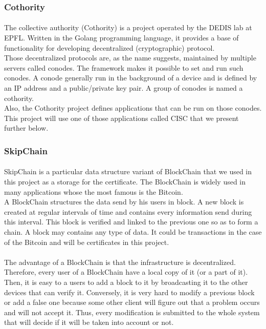 \documentclass[11pt, a4paper, twoside, openright]{article}
\begin{document}
\subsubsection{Cothority}
\label{sec:cothority}
\paragraph{}The collective authority (Cothority) is a project operated by the DEDIS lab at EPFL. Written in the Golang programming language, it provides a base of functionality for developing decentralized (cryptographic) protocol.
\\
Those decentralized protocols are, as the name suggests, maintained by multiple servers called conodes. The framework makes it possible to set and run such conodes. A conode  generally run in the background of a device and is defined by an IP address and a public/private key pair. A group of conodes is named a cothority.    
\\
 Also, the Cothority project defines applications that can be run on those conodes. This project will use one of those applications called CISC that we present further below.
\subsubsection{SkipChain}
\paragraph{}SkipChain is a particular data structure variant of BlockChain that we used in this project as a storage for the certificate. The BlockChain is widely used in many applications whose the most famous is the Bitcoin.
\\A BlockChain structures the data send by his users in block. A new block is created at regular intervals of time and contains every information send during this interval. This block is verified and linked to the previous one so as to form a chain. A block may contains any type of data. It could be transactions in the case of the Bitcoin and will be certificates in this project. 
\paragraph{}The advantage of a BlockChain is that the infrastructure is decentralized. Therefore, every user of a BlockChain have a local copy of it (or a part of it). Then, it is easy to a users to add a block to it by broadcasting it to the other devices that can verify it. Conversely, it is very hard to modify a previous block or add a false one because some other client will figure out that a problem occurs and will not accept it. Thus, every modification is submitted to the whole system that will decide if it will be taken into account or not. 
\end{document}
